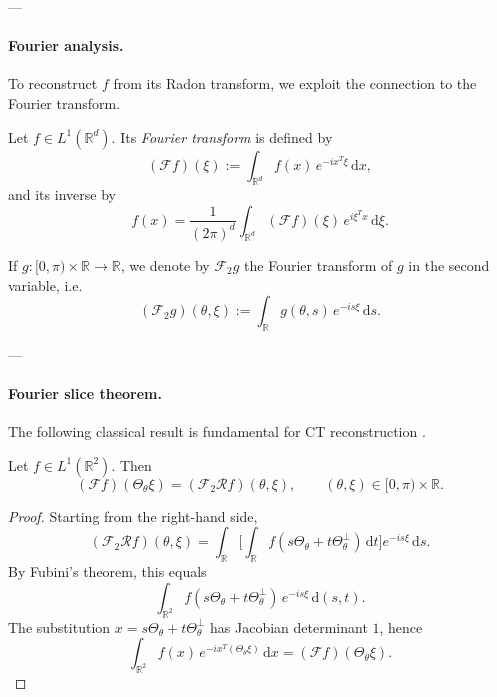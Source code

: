 \documentclass[12pt,a4paper]{article}
\begin{document}
---

\paragraph{Fourier analysis.}
To reconstruct $f$ from its Radon transform, we exploit the connection to the Fourier transform.

\begin{definition}
Let $f \in L^1(\mathbb{R}^d)$. Its \emph{Fourier transform} is defined by
\begin{equation}
(\mathcal{F}f)(\xi) := \int_{\mathbb{R}^d} f(x)\,e^{-i x^T \xi}\, \mathrm{d}x,
\label{eq:fourier}
\end{equation}
and its inverse by
\begin{equation}
f(x) = \frac{1}{(2\pi)^d}\int_{\mathbb{R}^d} (\mathcal{F}f)(\xi)\,e^{i \xi^T x}\, \mathrm{d}\xi.
\label{eq:fourier_inverse}
\end{equation}
\end{definition}

If $g:[0,\pi)\times \mathbb{R} \to \mathbb{R}$, we denote by $\mathcal{F}_2 g$ the Fourier transform of $g$ in the second variable, i.e.
\[
(\mathcal{F}_2 g)(\theta,\xi) := \int_{\mathbb{R}} g(\theta,s)\, e^{-i s \xi}\,\mathrm{d}s.
\]

---

\paragraph{Fourier slice theorem.}
The following classical result is fundamental for CT reconstruction \cite{math_of_ct}.

\begin{theorem}
\label{thm:fourier_slice}
Let $f \in L^1(\mathbb{R}^2)$. Then
\begin{equation}
(\mathcal{F}f)(\Theta_\theta \xi) = (\mathcal{F}_2 \mathcal{R}f)(\theta,\xi),
\qquad (\theta,\xi) \in [0,\pi)\times\mathbb{R}.
\label{eq:fourier_slice}
\end{equation}
\end{theorem}

\begin{proof}
Starting from the right-hand side,
\[
(\mathcal{F}_2 \mathcal{R}f)(\theta,\xi) 
= \int_{\mathbb{R}} \biggl[ \int_{\mathbb{R}} f(s \Theta_\theta + t \Theta_\theta^\perp)\,\mathrm{d}t \biggr] e^{-i s \xi}\,\mathrm{d}s.
\]
By Fubini’s theorem, this equals
\[
\int_{\mathbb{R}^2} f(s\Theta_\theta + t\Theta_\theta^\perp)\, e^{-i s \xi}\, \mathrm{d}(s,t).
\]
The substitution $x = s\Theta_\theta + t\Theta_\theta^\perp$ has Jacobian determinant $1$, hence
\[
\int_{\mathbb{R}^2} f(x)\, e^{-i x^T(\Theta_\theta \xi)}\, \mathrm{d}x = (\mathcal{F}f)(\Theta_\theta \xi).
\]
\end{proof}
\end{document}
